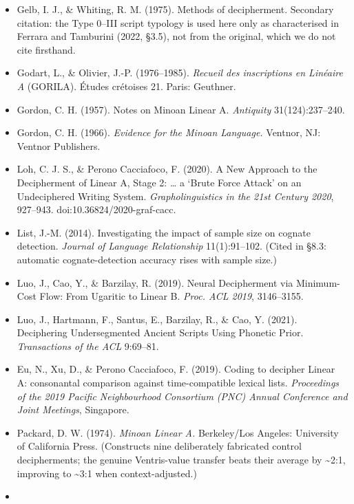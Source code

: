 \documentclass[
  10pt,
]{article}
\begin{document}
\begin{itemize}
  Fuls, A. (2015). Classifying undeciphered writing systems.
  \emph{Historische Sprachforschung} 128(1):42--58.
\item
  Gelb, I. J., \& Whiting, R. M. (1975). Methods of decipherment.
  Secondary citation: the Type 0--III script typology is used here only
  as characterised in Ferrara and Tamburini (2022, §3.5), not from the
  original, which we do not cite firsthand.
\item
  Godart, L., \& Olivier, J.-P. (1976--1985). \emph{Recueil des
  inscriptions en Linéaire A} (GORILA). Études crétoises 21. Paris:
  Geuthner.
\item
  Gordon, C. H. (1957). Notes on Minoan Linear A. \emph{Antiquity}
  31(124):237--240.
\item
  Gordon, C. H. (1966). \emph{Evidence for the Minoan Language.}
  Ventnor, NJ: Ventnor Publishers.
\item
  Loh, C. J. S., \& Perono Cacciafoco, F. (2020). A New Approach to the
  Decipherment of Linear A, Stage 2: \ldots{} a `Brute Force Attack' on
  an Undeciphered Writing System. \emph{Grapholinguistics in the 21st
  Century 2020}, 927--943. doi:10.36824/2020-graf-cacc.
\item
  List, J.-M. (2014). Investigating the impact of sample size on cognate
  detection. \emph{Journal of Language Relationship} 11(1):91--102.
  (Cited in §8.3: automatic cognate-detection accuracy rises with sample
  size.)
\item
  Luo, J., Cao, Y., \& Barzilay, R. (2019). Neural Decipherment via
  Minimum-Cost Flow: From Ugaritic to Linear B. \emph{Proc. ACL 2019},
  3146--3155.
\item
  Luo, J., Hartmann, F., Santus, E., Barzilay, R., \& Cao, Y. (2021).
  Deciphering Undersegmented Ancient Scripts Using Phonetic Prior.
  \emph{Transactions of the ACL} 9:69--81.
\item
  Eu, N., Xu, D., \& Perono Cacciafoco, F. (2019). Coding to decipher
  Linear A: consonantal comparison against time-compatible lexical
  lists. \emph{Proceedings of the 2019 Pacific Neighbourhood Consortium
  (PNC) Annual Conference and Joint Meetings}, Singapore.
\item
  Packard, D. W. (1974). \emph{Minoan Linear A.} Berkeley/Los Angeles:
  University of California Press. (Constructs nine deliberately
  fabricated control decipherments; the genuine Ventris-value transfer
  beats their average by \textasciitilde2:1, improving to
  \textasciitilde3:1 when context-adjusted.)
\item

\end{itemize}
\end{document}
